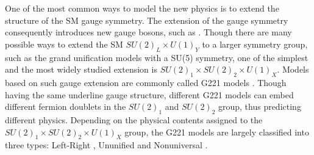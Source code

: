 One of the most common ways to model the new physics is to extend the structure of the SM gauge symmetry. The extension of the gauge symmetry consequently introduces new gauge bosons, such as \PWpr. Though there are many possible ways to extend the SM $SU(2)_L \times U(1)_Y $ to a larger symmetry group, such as the grand unification models with a SU(5) symmetry, one of the simplest and the most widely studied extension is $SU(2)_1 \times SU(2)_2 \times U(1)_X $. Models based on such gauge extension are commonly called G221 models \cite{Hsieh:2010zr}. Though having the same underline gauge structure, different G221 models can embed different fermion doublets in the $SU(2)_1$ and $SU(2)_2$ group, thus predicting different physics. Depending on the physical contents assigned to the $SU(2)_1 \times SU(2)_2 \times U(1)_X $ group, the G221 models are largely classified into three types: Left-Right \cite{PhysRevD.11.2558}, Ununified \cite{Chivukula:1994qw, GEORGI1990541} and Nonuniversal \cite{PhysRevLett.47.1788, MULLER1997192, PhysRevD.81.015006}.




